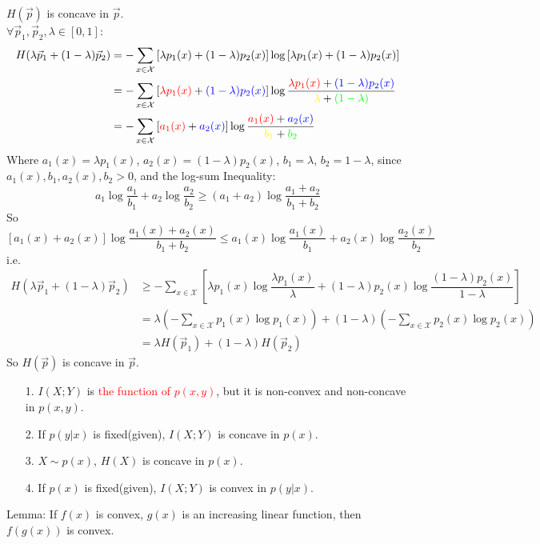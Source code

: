 \newpage

\begin{proposition}
$H(\vec{p})$ is concave in $\vec{p}$.\\
$\forall \vec{p}_1,\vec{p}_2,\lambda\in[0,1]$:
\begin{align*}
H(\lambda\vec{p}_1+(1-\lambda)\vec{p}_2) &= -\sum_{x\in \mathcal{X}}\left[\lambda p_1(x)+(1-\lambda)p_2(x)\right]\log\left[\lambda p_1(x)+(1-\lambda)p_2(x)\right] \\
&= -\sum_{x\in \mathcal{X}}\left[\textcolor{red}{\lambda p_1(x)}+\textcolor{blue}{(1-\lambda)p_2(x)}\right]\log\dfrac{\textcolor{red}{\lambda p_1(x)}+\textcolor{blue}{(1-\lambda)p_2(x)}}{\textcolor{yellow}{\lambda} + \textcolor{green}{(1-\lambda)}} \\
&= -\sum_{x\in \mathcal{X}}\left[\textcolor{red}{a_1(x)}+\textcolor{blue}{a_2(x)}\right]\log\dfrac{\textcolor{red}{a_1(x)}+\textcolor{blue}{a_2(x)}}{\textcolor{yellow}{b_1} + \textcolor{green}{b_2}}
\end{align*}
Where $a_1(x)=\lambda p_1(x)$, $a_2(x)=(1-\lambda)p_2(x)$, $b_1=\lambda$, $b_2=1-\lambda$, since $a_1(x),b_1,a_2(x),b_2>0$, and the log-sum Inequality:
$$a_1\log\dfrac{a_1}{b_1}+a_2\log\dfrac{a_2}{b_2}\geq (a_1+a_2)\log\dfrac{a_1+a_2}{b_1+b_2}$$
So
$$\left[a_1(x)+a_2(x)\right]\log\dfrac{a_1(x)+a_2(x)}{b_1 + b_2}\leq a_1(x)\log\dfrac{a_1(x)}{b_1}+a_2(x)\log\dfrac{a_2(x)}{b_2}$$
i.e.
\begin{align*}
H(\lambda\vec{p}_1+(1-\lambda)\vec{p}_2) &\geq -\sum_{x\in\mathcal{X}} \left[\lambda p_1(x)\log\dfrac{\lambda p_1(x)}{\lambda} + (1-\lambda)p_2(x)\log\dfrac{(1-\lambda)p_2(x)}{1-\lambda}\right] \\
&= \lambda \left(-\sum_{x\in\mathcal{X}} p_1(x)\log p_1(x)\right) + (1-\lambda)\left(-\sum_{x\in\mathcal{X}} p_2(x)\log p_2(x)\right) \\
&= \lambda H(\vec{p}_1) + (1-\lambda)H(\vec{p}_2)
\end{align*}
So $H(\vec{p})$ is concave in $\vec{p}$.
\end{proposition}

\begin{proposition}
\begin{itemize}
\item[1.] $I(X;Y)$ is \textcolor{red}{the function of $p(x,y)$}, but it is non-convex and non-concave in $p(x,y)$.
\item[2.] If $p(y|x)$ is fixed(given), $I(X;Y)$ is concave in $p(x)$.
\item[3.] $X\sim p(x)$, $H(X)$ is concave in $p(x)$.
\item[4.] If $p(x)$ is fixed(given), $I(X;Y)$ is convex in $p(y|x)$.
\end{itemize}

Lemma: If $f(x)$ is convex, $g(x)$ is an increasing linear function, then $f(g(x))$ is convex.

\end{proposition}

